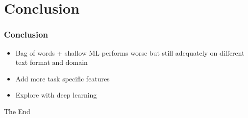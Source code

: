 \documentclass{beamer}
\begin{document}
\section{Conclusion}

\begin{frame}
\frametitle{Conclusion}
\begin{itemize}
\item Bag of words + shallow ML performs worse but still adequately on different text format and domain
\item Add more task specific features
\item Explore with deep learning
\end{itemize}
\end{frame}


\begin{frame}
\Huge{\centerline{The End}}
\end{frame}

\end{document}
